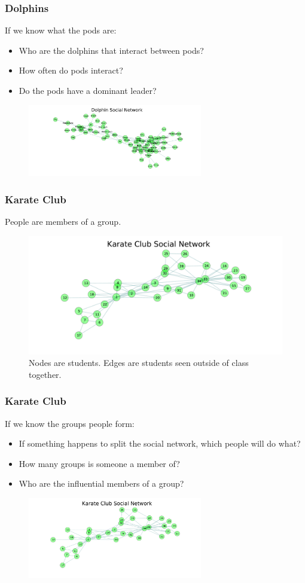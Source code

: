 \documentclass{beamer}
\begin{document}
\begin{frame}\frametitle{Dolphins}
If we know what the pods are:
\begin{itemize}
\item Who are the dolphins that interact between pods?
\item How often do pods interact?
\item Do the pods have a dominant leader?
\end{itemize}
\begin{figure}
\includegraphics[width=3in]{Figures/dolphin_social_network}
\end{figure}
\end{frame}


\begin{frame}\frametitle{Karate Club}
People are members of a group.
\begin{figure}
\includegraphics[width=4.5in]{Figures/karate_social_network}
\caption{Nodes are students.  Edges are students seen outside of class together.}
\end{figure}
\end{frame}



\begin{frame}\frametitle{Karate Club}
If we know the groups people form:
\begin{itemize}
\item If something happens to split the social network, which people will do what?
\item How many groups is someone a member of?
\item Who are the influential members of a group?
\end{itemize}
\begin{figure}
\includegraphics[width=3in]{Figures/karate_social_network}
\end{figure}
\end{frame}
\end{document}
